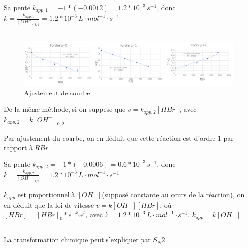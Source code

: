 \documentclass[a4paper,12pt]{book}
\begin{document}
\hspace*{\fill} 

Sa pente $\boxed{k_{app,1}=-1*(-0.0012)=1.2*10^{-3}\,s^{-1}}$, donc $k=\frac{k_{app,1}}{[OH^{-}]_{0,1}}=1.2*10^{-3}\,L\cdot mol^{-1}\cdot s^{-1}$
\subsection{}
\begin{figure}[h]
    \begin{center}
    \includegraphics[scale=0.45]{dm92.png}
    \end{center}
    \caption{Ajustement de courbe}
\end{figure}
De la même méthode, si on suppose que $v=k_{app,2}[HBr]$, avec $k_{app,2}=k[OH^{-}]_{0,2}$

\hspace*{\fill} 

Par ajustement du courbe, on en déduit que cette réaction est d'ordre 1 par rapport à $RBr$

\hspace*{\fill} 

Sa pente $\boxed{k_{app,2}=-1*(-0.0006)=0.6*10^{-3}\,s^{-1}}$, donc $k=\frac{k_{app,2}}{[OH^{-}]_{0,2}}=1.2*10^{-3}\,L\cdot mol^{-1}\cdot s^{-1}$

\hspace*{\fill} 

$k_{app}$ est proportionnel à $[OH^{-}]$(supposé constante au cours de la réaction), on en déduit que la loi de vitesse $\boxed{v=k[OH^{-}][HBr]}$, 
où $[HBr]=[HBr]_0*e^{-k_{app}t}$, avec $k=1.2*10^{-3}\,L\cdot mol^{-1}\cdot s^{-1}$, $k_{app}=k[OH^{-}]$


\subsection{}
La transformation chimique peut s’expliquer par $S_N2$
\end{document}
